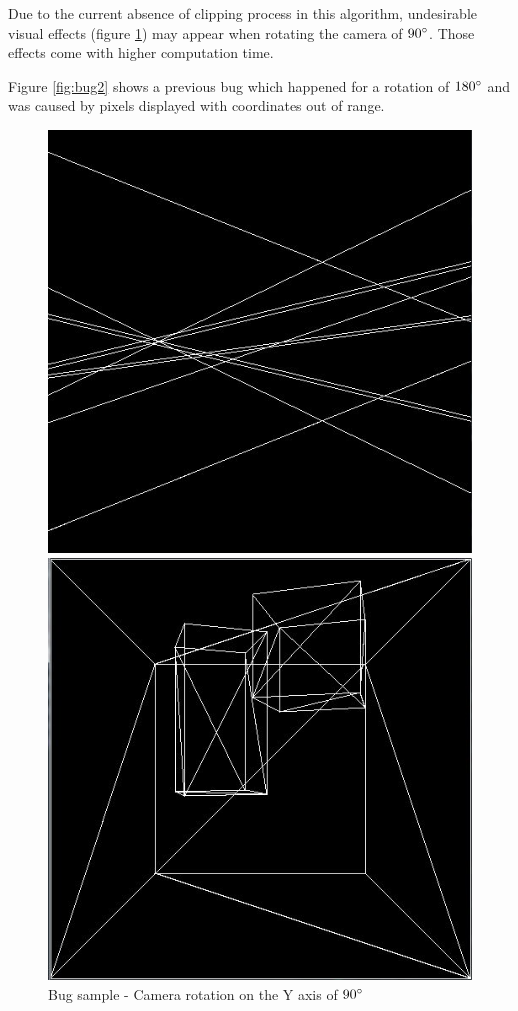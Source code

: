 Due to the current absence of clipping process in this algorithm, undesirable visual effects (figure \ref{fig:bug1}) may appear when rotating the camera of $90 \degree$. Those effects come with higher computation time.

Figure \ref{fig:bug2} shows a previous bug which happened for a rotation of $180 \degree$ and was caused by pixels displayed with coordinates out of range.

\begin{figure}[H]
\centering
{}
    \centering
    \includegraphics[width=\linewidth]{img/bug1.jpg}
    \caption{Bug sample - Camera rotation on the Y axis of $90 \degree$}
    \label{fig:bug1}
\endminipage
{}
    \centering
    \includegraphics[width=\linewidth]{img/bug2.jpg}

\end{figure}
